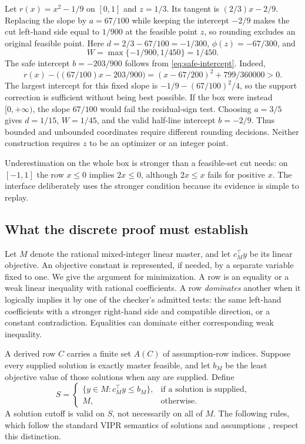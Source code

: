 \begin{example}
\label{ex:rounding}
Let $r(x)=x^2-1/9$ on $[0,1]$ and $z=1/3$. Its tangent is $(2/3)x-2/9$. Replacing the slope by $a=67/100$ while keeping the intercept $-2/9$ makes the cut left-hand side equal to $1/900$ at the feasible point $z$, so rounding excludes an original feasible point. Here $d=2/3-67/100=-1/300$, $\phi(z)=-67/300$, and
\[
 W=\max\{-1/900,1/450\}=1/450.
\]
The safe intercept $b=-203/900$ follows from \eqref{eq:safe-intercept}. Indeed,
\[
 r(x)-\bigl((67/100)x-203/900\bigr)
 =(x-67/200)^2+799/360000>0.
\]
The largest intercept for this fixed slope is $-1/9-(67/100)^2/4$, so the support correction is sufficient without being best possible. If the box were instead $[0,+\infty)$, the slope $67/100$ would fail the residual-sign test. Choosing $a=3/5$ gives $d=1/15$, $W=1/45$, and the valid half-line intercept $b=-2/9$. Thus bounded and unbounded coordinates require different rounding decisions. Neither construction requires $z$ to be an optimizer or an integer point.
\end{example}
Underestimation on the whole box is stronger than a feasible-set cut needs: on $[-1,1]$ the row $x\leq0$ implies $2x\leq0$, although $2x\leq x$ fails for positive $x$. The interface deliberately uses the stronger condition because its evidence is simple to replay.

\subsection{What the discrete proof must establish}
\label{sec:discrete-soundness}
Let $M$ denote the rational mixed-integer linear master, and let $c_M^\top y$ be its linear objective. An objective constant is represented, if needed, by a separate variable fixed to one. We give the argument for minimization. A row is an equality or a weak linear inequality with rational coefficients. A row \emph{dominates} another when it logically implies it by one of the checker's admitted tests: the same left-hand coefficients with a stronger right-hand side and compatible direction, or a constant contradiction. Equalities can dominate either corresponding weak inequality.

A derived row $C$ carries a finite set $A(C)$ of assumption-row indices. Suppose every supplied solution is exactly master feasible, and let $b_M$ be the least objective value of those solutions when any are supplied. Define
\begin{equation}
 S=\begin{cases}
 \{y\in M:c_M^\top y\leq b_M\},&\text{if a solution is supplied},\\
 M,&\text{otherwise}.
 \end{cases}
 \label{eq:incumbent-set}
\end{equation}
A solution cutoff is valid on $S$, not necessarily on all of $M$. The following rules, which follow the standard VIPR semantics of solutions and assumptions \citep{cheung2017-vipr,wood2026-vipr-smt}, respect this distinction.

